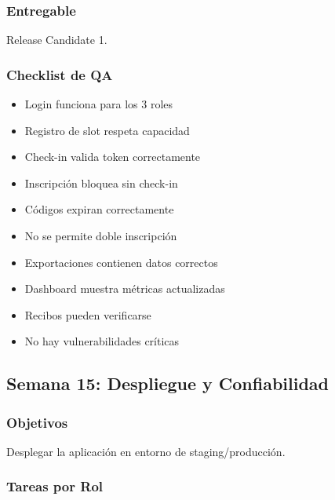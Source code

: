 \documentclass[12pt,a4paper]{article}
\begin{document}
\subsubsection{Entregable}
Release Candidate 1.

\subsubsection{Checklist de QA}
\begin{itemize}[leftmargin=*]
    \item Login funciona para los 3 roles
    \item Registro de slot respeta capacidad
    \item Check-in valida token correctamente
    \item Inscripción bloquea sin check-in
    \item Códigos expiran correctamente
    \item No se permite doble inscripción
    \item Exportaciones contienen datos correctos
    \item Dashboard muestra métricas actualizadas
    \item Recibos pueden verificarse
    \item No hay vulnerabilidades críticas
\end{itemize}

\subsection{Semana 15: Despliegue y Confiabilidad}

\subsubsection{Objetivos}
Desplegar la aplicación en entorno de staging/producción.

\subsubsection{Tareas por Rol}
\end{document}
